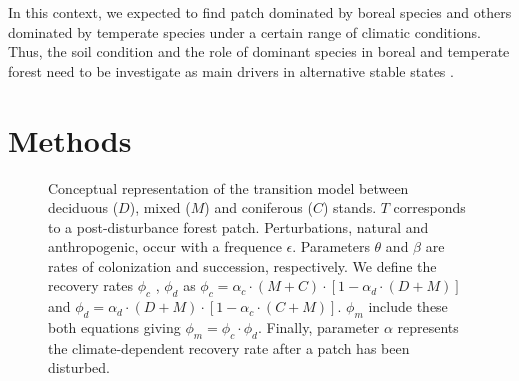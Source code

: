 
In this context, we expected to find patch dominated by boreal species and
others dominated by temperate species under a certain range of climatic
conditions. Thus, the soil condition and the role of dominant species in
boreal and temperate forest need to be investigate as main drivers in
alternative stable states
\cite{Kellman2004,Moore2008,DeFrenne2013,Barras1998}.



\section{Methods}   

\begin{figure}
	
	\caption{Conceptual representation of the transition model between deciduous ($D$),
	mixed ($M$) and coniferous ($C$) stands. $T$ corresponds to a post-disturbance forest patch. Perturbations, natural and anthropogenic, occur with a frequence $\epsilon$. Parameters $\theta$ and $\beta$ are rates of colonization and succession,
	respectively. We define the recovery rates $\phi_c$ , $\phi_d$ as $\phi_c
	= \alpha_c \cdot (M+C) \cdot [1- \alpha_d \cdot (D +M)]$ and $\phi_d =
	\alpha_d \cdot (D+M) \cdot [1- \alpha_c \cdot (C +M)]$. $\phi_m$ include these both equations giving $\phi_m = \phi_c \cdot \phi_d$. Finally, parameter $\alpha$ represents the climate-dependent recovery rate after a patch has been disturbed.}
	\label{Model}
\end{figure}


